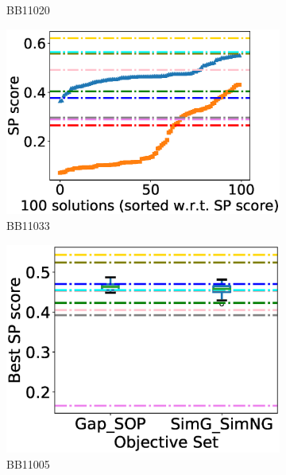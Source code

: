 \begin{figure}[!htbp]
\begin{adjustwidth}{-1cm}{-1cm}
\begin{subfigure}{0.26\textwidth}
			\caption{BB11020}
\end{subfigure}
\begin{subfigure}{0.26\textwidth}
			\includegraphics[width=\columnwidth]{Figure/summary/precomputedInit/Balibase/BB11033_pairs_density_single_run_2}
			\caption{BB11033}
\end{subfigure}
		\begin{subfigure}{0.26\textwidth}
			\includegraphics[width=\columnwidth]{Figure/summary/precomputedInit/Balibase/BB11005_objset_pairs_rank_2}
			\caption{BB11005}
\end{subfigure}    
		\begin{subfigure}{0.26\textwidth}

\end{subfigure}
\end{adjustwidth}
\end{figure}
